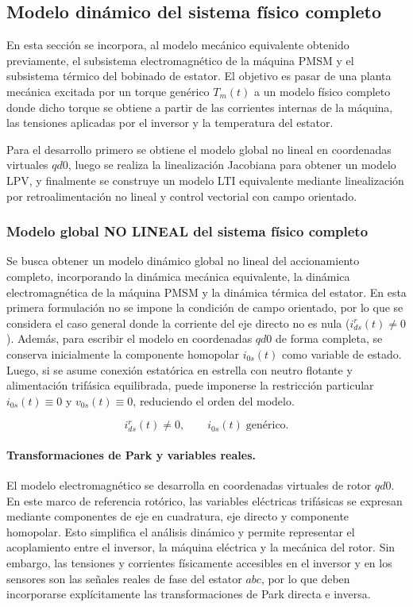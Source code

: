 \documentclass[10pt,a4paper]{article}
\begin{document}
\subsection{Modelo dinámico del sistema físico completo}

En esta sección se incorpora, al modelo mecánico equivalente obtenido previamente, el subsistema electromagnético de la máquina PMSM y el subsistema térmico del bobinado de estator. El objetivo es pasar de una planta mecánica excitada por un torque genérico \(T_m(t)\) a un modelo físico completo donde dicho torque se obtiene a partir de las corrientes internas de la máquina, las tensiones aplicadas por el inversor y la temperatura del estator.

Para el desarrollo primero se obtiene el modelo global no lineal en coordenadas virtuales \(qd0\), luego se realiza la linealización Jacobiana para obtener un modelo LPV, y finalmente se construye un modelo LTI equivalente mediante linealización por retroalimentación no lineal y control vectorial con campo orientado.

\subsubsection{Modelo global NO LINEAL del sistema físico completo}

Se busca obtener un modelo dinámico global no lineal del accionamiento completo, incorporando la dinámica mecánica equivalente, la dinámica electromagnética de la máquina PMSM y la dinámica térmica del estator. En esta primera formulación no se impone la condición de campo orientado, por lo que se considera el caso general donde la corriente del eje directo no es nula ($i_{ds}^{r}(t)\neq 0$). Además, para escribir el modelo en coordenadas $qd0$ de forma completa, se conserva inicialmente la componente homopolar $i_{0s}(t)$ como variable de estado. Luego, si se asume conexión estatórica en estrella con neutro flotante y alimentación trifásica equilibrada, puede imponerse la restricción particular $i_{0s}(t)\equiv 0$ y $v_{0s}(t)\equiv 0$, reduciendo el orden del modelo.

\begin{equation*}
	i_{ds}^{r}(t)\neq 0, \qquad i_{0s}(t) \; \text{genérico}.
\end{equation*}


\paragraph{Transformaciones de Park y variables reales.}
El modelo electromagnético se desarrolla en coordenadas virtuales de rotor $qd0$. En este marco de referencia rotórico, las variables eléctricas trifásicas se expresan mediante componentes de eje en cuadratura, eje directo y componente homopolar. Esto simplifica el análisis dinámico y permite representar el acoplamiento entre el inversor, la máquina eléctrica y la mecánica del rotor. Sin embargo, las tensiones y corrientes físicamente accesibles en el inversor y en los sensores son las señales reales de fase del estator $abc$, por lo que deben incorporarse explícitamente las transformaciones de Park directa e inversa.
\end{document}
